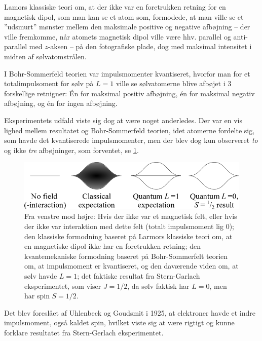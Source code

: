 Lamors klassiske teori om, at der ikke var en foretrukken retning for en magnetisk dipol, som man kan se et atom som, formodede, at man ville se et ''udsmurt'' mønster mellem den maksimale positive og negative afbøjning -- der ville fremkomme, når atomets magnetisk dipol ville være hhv. parallel og anti-parallel med $z$-aksen -- på den fotografiske plade, dog med maksimal intensitet i midten af sølvatomstrålen.

I Bohr-Sommerfeld teorien var impulsmomenter kvantiseret, hvorfor man for et totalimpulsoment for sølv på $L = 1$ ville se sølvatomerne blive afbøjet i 3 forskellige retnigner: Én for maksimal positiv afbøjning, én for maksimal negativ afbøjning, og én for ingen afbøjning.

Eksperimentets udfald viste sig dog at være noget anderledes. Der var en vis lighed mellem resultatet og Bohr-Sommerfeld teorien, idet atomerne fordelte sig, som havde det kvantiserede impulsmomenter, men der blev dog kun observeret \emph{to} og ikke \emph{tre} afbøjninger, som forventet, se \cref{fig:Q08_SternGarlachExperimentResult}.

\begin{figure}[!h]
    \centering
    \includegraphics[width=\textwidth]{Q08/images/SternGerlachExperimentResult.png}
    \caption{Fra venstre mod højre: Hvis der ikke var et magnetisk felt, eller hvis der ikke var interaktion med dette felt (totalt impulsmoment lig $0$); den klassiske formodning baseret på Larmors klassiske teori om, at en magnetiske dipol ikke har en foretrukken retning; den kvantemekaniske formodning baseret på Bohr-Sommerfelt teorien om, at impulsmoment er kvantiseret, og den daværende viden om, at sølv havde $L = 1$; det faktiske resultat fra Stern-Garlach eksperimentet, som viser $J = 1/2$, da sølv faktisk har $L = 0$, men har spin $S = 1/2$.}
    \label{fig:Q08_SternGarlachExperimentResult}
\end{figure}

Det blev foreslået af Uhlenbeck og Goudsmit i 1925, at elektroner havde et indre impulsmoment, også kaldet spin, hvilket viste sig at være rigtigt og kunne forklare resultatet fra Stern-Gerlach eksperimentet.

